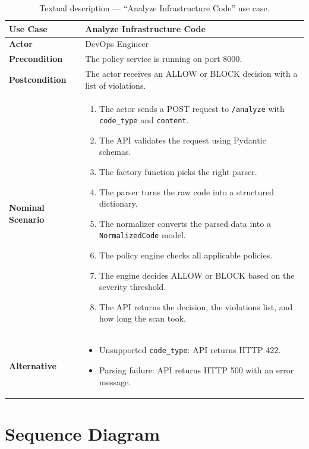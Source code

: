 \begin{table}[H]
\centering
\begin{tabularx}{\textwidth}{|l|X|}
\hline
\textbf{Use Case} & Analyze Infrastructure Code \\
\hline
\textbf{Actor} & DevOps Engineer \\
\hline
\textbf{Precondition} & The policy service is running on port 8000. \\
\hline
\textbf{Postcondition} & The actor receives an ALLOW or BLOCK decision with a list of violations. \\
\hline
\textbf{Nominal Scenario} &
  \begin{enumerate}[leftmargin=0.8cm, nosep]
    \item The actor sends a POST request to \texttt{/analyze} with \texttt{code\_type} and \texttt{content}.
    \item The API validates the request using Pydantic schemas.
    \item The factory function picks the right parser.
    \item The parser turns the raw code into a structured dictionary.
    \item The normalizer converts the parsed data into a \texttt{NormalizedCode} model.
    \item The policy engine checks all applicable policies.
    \item The engine decides ALLOW or BLOCK based on the severity threshold.
    \item The API returns the decision, the violations list, and how long the scan took.
  \end{enumerate} \\
\hline
\textbf{Alternative} &
  \begin{itemize}[leftmargin=0.8cm, nosep]
    \item[A1.] Unsupported \texttt{code\_type}: API returns HTTP 422.
    \item[A2.] Parsing failure: API returns HTTP 500 with an error message.
  \end{itemize} \\
\hline
\end{tabularx}
\caption{Textual description --- ``Analyze Infrastructure Code'' use case.}
\label{tab:uc-analyze}
\end{table}


\section{Sequence Diagram}

